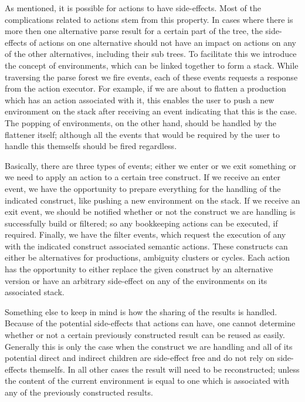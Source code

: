 \documentclass[a4paper,10pt]{article}
\begin{document}
As mentioned, it is possible for actions to have side-effects. Most of the complications related to actions stem from this property. In cases where there is more then one alternative parse result for a certain part of the tree, the side-effects of actions on one alternative should not have an impact on actions on any of the other alternatives, including their sub trees. To facilitate this we introduce the concept of environments, which can be linked together to form a stack. While traversing the parse forest we fire events, each of these events requests a response from the action executor. For example, if we are about to flatten a production which has an action associated with it, this enables the user to push a new environment on the stack after receiving an event indicating that this is the case. The popping of environments, on the other hand, should be handled by the flattener itself; although all the events that would be required by the user to handle this themselfs should be fired regardless.

Basically, there are three types of events; either we enter or we exit something or we need to apply an action to a certain tree construct. If we receive an enter event, we have the opportunity to prepare everything for the handling of the indicated construct, like pushing a new environment on the stack. If we receive an exit event, we should be notified whether or not the construct we are handling is successfully build or filtered; so any bookkeeping actions can be executed, if required. Finally, we have the filter events, which request the execution of any with the indicated construct associated semantic actions. These constructs can either be alternatives for productions, ambiguity clusters or cycles. Each action has the opportunity to either replace the given construct by an alternative version or have an arbitrary side-effect on any of the environments on its associated stack.

Something else to keep in mind is how the sharing of the results is handled. Because of the potential side-effects that actions can have, one cannot determine whether or not a certain previously constructed result can be reused as easily. Generally this is only the case when the construct we are handling and all of its potential direct and indirect children are side-effect free and do not rely on side-effects themselfs. In all other cases the result will need to be reconstructed; unless the content of the current environment is equal to one which is associated with any of the previously constructed results.
\end{document}

